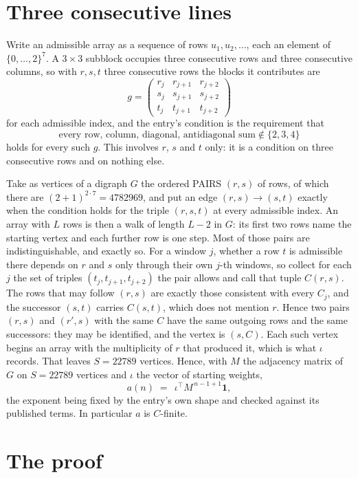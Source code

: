 \documentclass[11pt,a4paper]{article}
\theoremstyle{plain}
\theoremstyle{definition}
\begin{document}
\section{Three consecutive lines}

Write an admissible array as a sequence of rows $u_1,u_2,\dots$, each an element of
$\{0,\dots,2\}^{7}$. A $3\times3$ subblock occupies three consecutive rows and
three consecutive columns, so with $r,s,t$ three consecutive rows the blocks it
contributes are
\[
g=\begin{pmatrix}r_j&r_{j+1}&r_{j+2}\\ s_j&s_{j+1}&s_{j+2}\\ t_j&t_{j+1}&t_{j+2}\end{pmatrix}
\]
for each admissible index, and the entry's condition is the requirement that
\[
\text{every row, column, diagonal, antidiagonal sum} \notin \{2,3,4\}
\]
holds for every such $g$. This involves $r$, $s$ and $t$ only: it is a condition on
three consecutive rows and on nothing else.

Take as vertices of a digraph $G$ the ordered PAIRS $(r,s)$ of rows, of which there are
$(2+1)^{2\cdot7}=4782969$, and put an edge $(r,s)\to(s,t)$ exactly when the condition
holds for the triple $(r,s,t)$ at every admissible index. An array with $L$ rows is then a
walk of length $L-2$ in $G$: its first two rows name the starting vertex and each further
row is one step. Most of those pairs are indistinguishable, and exactly so. For a window $j$, whether a row $t$ is admissible there depends on $r$ and $s$ only through their own $j$-th windows, so collect for each $j$ the set of triples $(t_j,t_{j+1},t_{j+2})$ the pair allows and call that tuple $C(r,s)$. The rows that may follow $(r,s)$ are exactly those consistent with every $C_j$, and the successor $(s,t)$ carries $C(s,t)$, which does not mention $r$. Hence two pairs $(r,s)$ and $(r',s)$ with the same $C$ have the same outgoing rows and the same successors: they may be identified, and the vertex is $(s,C)$. Each such vertex begins an array with the multiplicity of $r$ that produced it, which is what $\iota$ records. That leaves $S=22789$ vertices. Hence, with $M$ the adjacency matrix of $G$ on $S=22789$ vertices and
$\iota$ the vector of starting weights,
\[
a(n)\;=\;\,\iota^{\!\top}M^{\,n-1+1}\mathbf{1},
\]
the exponent being fixed by the entry's own shape and checked against its published terms.
In particular $a$ is $C$-finite.

\section{The proof}
\end{document}
